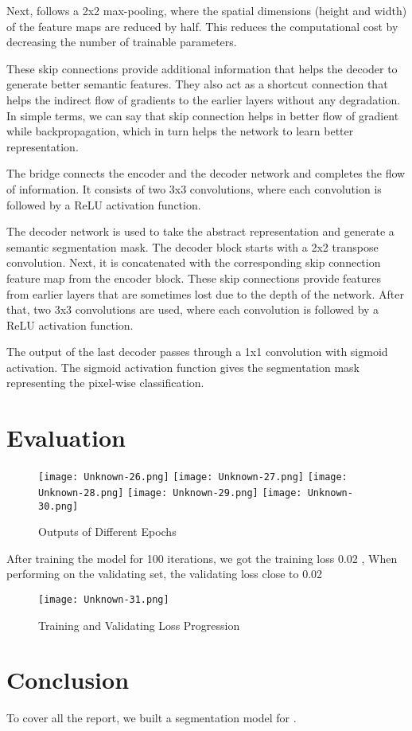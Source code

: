 \documentclass[twocolumn]{article}
\begin{document}
Next, follows a 2x2 max-pooling, where the spatial dimensions (height and width) of the feature maps are reduced by half. This reduces the computational cost by decreasing the number of trainable parameters.

These skip connections provide additional information that helps the decoder to generate better semantic features. They also act as a shortcut connection that helps the indirect flow of gradients to the earlier layers without any degradation. In simple terms, we can say that skip connection helps in better flow of gradient while backpropagation, which in turn helps the network to learn better representation.

The bridge connects the encoder and the decoder network and completes the flow of information. It consists of two 3x3 convolutions, where each convolution is followed by a ReLU activation function.

The decoder network is used to take the abstract representation and generate a semantic segmentation mask. The decoder block starts with a 2x2 transpose convolution. Next, it is concatenated with the corresponding skip connection feature map from the encoder block. These skip connections provide features from earlier layers that are sometimes lost due to the depth of the network. After that, two 3x3 convolutions are used, where each convolution is followed by a ReLU activation function.

The output of the last decoder passes through a 1x1 convolution with sigmoid activation. The sigmoid activation function gives the segmentation mask representing the pixel-wise classification.

\section{Evaluation}

\begin{figure}
    \centering
    \texttt{[image: Unknown-26.png]}
    \texttt{[image: Unknown-27.png]}
    \texttt{[image: Unknown-28.png]}
    \texttt{[image: Unknown-29.png]}
    \texttt{[image: Unknown-30.png]}
    \caption{Outputs of Different Epochs}
    \label{fig:output}
\end{figure}

After training the model for 100 iterations, we got the training loss 0.02 , When performing on the validating set, the validating loss close to 0.02

\begin{figure}
    \centering
    \texttt{[image: Unknown-31.png]}
    \caption{Training and Validating Loss Progression}
    \label{fig:loss}
\end{figure}

\section{Conclusion}
To cover all the report, we built a segmentation model for .
\end{document}
